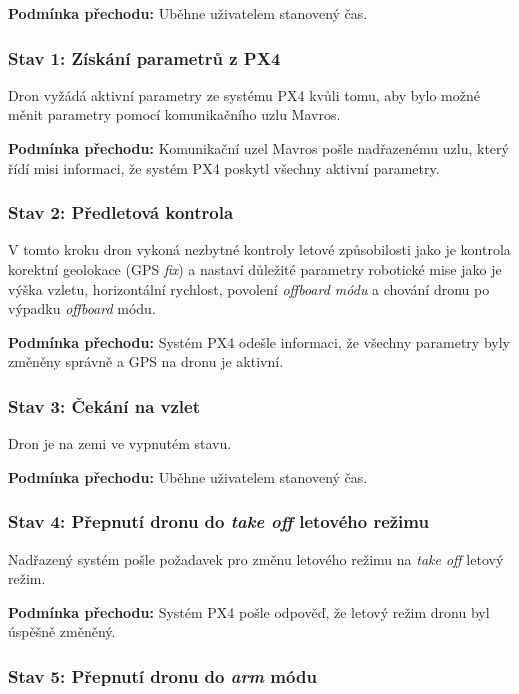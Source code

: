 \noindent\textbf{Podmínka přechodu:} Uběhne uživatelem stanovený čas.

\subsubsection{Stav 1: Získání parametrů z PX4}

Dron vyžádá aktivní parametry ze systému PX4 kvůli tomu, aby bylo možné měnit parametry pomocí komunikačního uzlu Mavros.

\noindent\textbf{Podmínka přechodu:} Komunikační uzel Mavros pošle nadřazenému uzlu, který řídí misi informaci, že systém PX4 poskytl všechny aktivní parametry.

\subsubsection{Stav 2: Předletová kontrola}

V tomto kroku dron vykoná nezbytné kontroly letové způsobilosti jako je kontrola korektní geolokace (GPS \textit{fix}) a nastaví důležité parametry robotické mise jako je výška vzletu, horizontální rychlost, povolení \textit{offboard módu} a chování dronu po výpadku \textit{offboard} módu.

\noindent\textbf{Podmínka přechodu:} Systém PX4 odešle informaci, že všechny parametry byly změněny správně a GPS na dronu je aktivní.

\subsubsection{Stav 3: Čekání na vzlet}

Dron je na zemi ve vypnutém stavu.

\noindent\textbf{Podmínka přechodu:} Uběhne uživatelem stanovený čas.

\subsubsection{Stav 4: Přepnutí dronu do \textit{take off} letového režimu}

Nadřazený systém pošle požadavek pro změnu letového režimu na \textit{take off} letový režim.

\noindent\textbf{Podmínka přechodu:} Systém PX4 pošle odpověď, že letový režim dronu byl úspěšně změněný.

\subsubsection{Stav 5: Přepnutí dronu do \textit{arm} módu}

